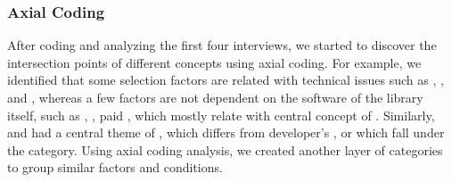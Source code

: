 \subsubsection{Axial Coding} After coding and analyzing the first four interviews, we started to discover the intersection points of different concepts using axial coding. For example, we identified that some selection factors are related with technical issues such as , , and , whereas a few factors are not dependent on the software of the library itself, such as , , paid , which mostly relate with central concept of . Similarly,  and  had a central theme of , which differs from developer's ,  or  which fall under the  category. Using axial coding analysis, we created another layer of categories to group similar factors and conditions. 


